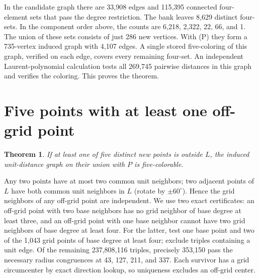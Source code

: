 \documentclass[11pt,letterpaper]{article}
\newtheorem{theorem}{Theorem}
\begin{document}
In the candidate graph there are 33,908 edges and 115,395
connected four-element sets that pass the degree restriction.
The bank leaves 8,629 distinct four-sets. In the component
order above, the counts are 6,218, 2,322, 22, 66, and 1.
The union of these sets consists of just 286 new vertices.
With (P) they form a 735-vertex induced graph with 4,107
edges. A single stored five-coloring of this graph, verified
on each edge, covers every remaining four-set. An independent Laurent-polynomial
calculation tests all 269,745 pairwise distances in this graph
and verifies the coloring. This proves the theorem.

\section{Five points with at least one off-grid point}
\begin{theorem}
If at least one of five distinct new points is outside \(L\), the
induced unit-distance graph on their union with \(P\) is five-colorable.
\end{theorem}
 Any two points have at most two common unit
neighbors; two adjacent points of $L$ have both common unit neighbors
in $L$ (rotate by $\pm60^\circ$). Hence the grid neighbors of any
off-grid point are independent. We use two exact certificates:
an off-grid point with two base neighbors has no grid neighbor of
base degree at least three, and an off-grid point with one base
neighbor cannot have two grid neighbors of base degree at least four.
For the latter, test one base point and two of the 1,043 grid points
of base degree at least four; exclude triples containing a unit
edge. Of the remaining 237,808,116 triples, precisely 353,150 pass
the necessary radius congruences at 43, 127, 211, and 337. Each
survivor has a grid circumcenter by exact direction lookup, so
uniqueness excludes an off-grid center.
\end{document}
